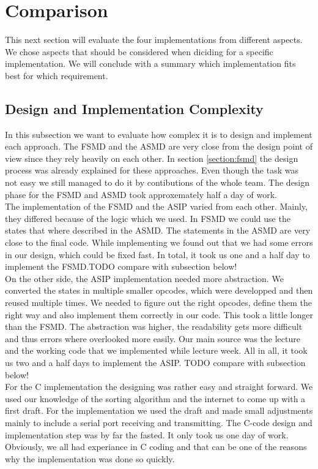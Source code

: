 \documentclass[conference]{IEEEtran}
\begin{document}
\section{Comparison}
This next section will evaluate the four implementations from different aspects. We chose aspects that should be considered when diciding for a specific implementation. We will conclude with a summary which implementation fits best for which requirement.
\subsection{Design and Implementation Complexity}
In this subsection we want to evaluate how complex it is to design and implement each approach. The FSMD and the ASMD are very close from the design point of view since they rely heavily on each other. In section \autoref{section:fsmd} the design process was already explained for these approaches. Even though the task was not easy we still managed to do it by contibutions of the whole team. The design phase for the FSMD and ASMD took approxemately half a day of work.\\
The implementation of the FSMD and the ASIP varied from each other. Mainly, they differed because of the logic which we used. In FSMD we could use the states that where described in the ASMD. The statements in the ASMD are very close to the final code. While implementing we found out that we had some errors in our design, which could be fixed fast. In total, it took us one and a half day to implement the FSMD.TODO compare with subsection below!\\ 
On the other side, the ASIP implementation needed more abstraction. We converted the states in multiple smaller opcodes, which were developped and then reused multiple times. We needed to figure out the right opcodes, define them the right way and also implement them correctly in our code. This took a little longer than the FSMD. The abstraction was higher, the readability gets more difficult and thus errors where overlooked more easily. Our main source was the lecture and the working code that we implemented while lecture week. All in all, it took us two and a half days to implement the ASIP. TODO compare with subsection below!\\
For the C implementation the designing was rather easy and straight forward. We used our knowledge of the sorting algorithm and the internet to come up with a first draft. For the implementation we used the draft and made small adjustments mainly to include a serial port receiving and transmitting. The C-code design and implementation step was by far the fasted. It only took us one day of work. Obviously, we all had experiance in C coding and that can be one of the reasons why the implementation was done so quickly. \\
\end{document}
